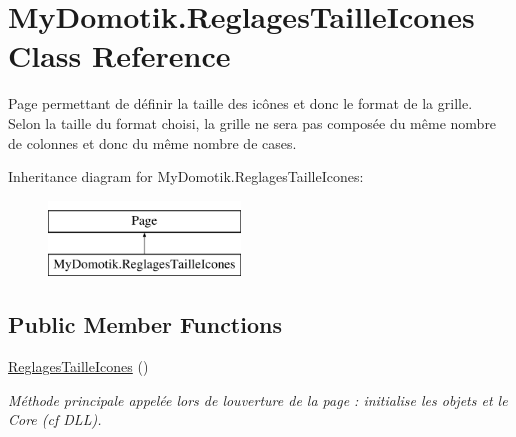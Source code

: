 \hypertarget{class_my_domotik_1_1_reglages_taille_icones}{}\section{My\+Domotik.\+Reglages\+Taille\+Icones Class Reference}
\label{class_my_domotik_1_1_reglages_taille_icones}


Page permettant de définir la taille des icônes et donc le format de la grille. ~\newline
Selon la taille du format choisi, la grille ne sera pas composée du même nombre de colonnes et donc du même nombre de cases.  


Inheritance diagram for My\+Domotik.\+Reglages\+Taille\+Icones\+:\begin{figure}[H]
\begin{center}
\leavevmode
\includegraphics[height=2.000000cm]{class_my_domotik_1_1_reglages_taille_icones}
\end{center}
\end{figure}
\subsection*{Public Member Functions}
\begin{DoxyCompactItemize}
\item 
\hyperlink{class_my_domotik_1_1_reglages_taille_icones_a3220f74b311c28c8be1fe596a7288479}{Reglages\+Taille\+Icones} ()
\begin{DoxyCompactList}\small\item\em Méthode principale appelée lors de l\textquotesingle{}ouverture de la page \+: initialise les objets et le Core (cf D\+LL). \end{DoxyCompactList}\end{DoxyCompactItemize}
